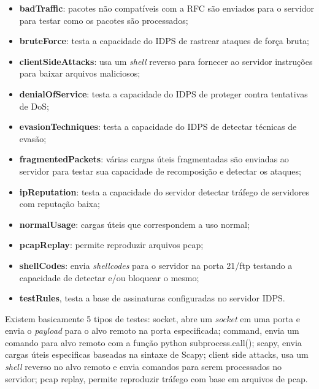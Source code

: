 \documentclass[
	12pt,				
	openright,		
	twoside,	
	a4paper,
	english,	
	brazil	
	]{abntex2}
\begin{document}
\begin{itemize}
 \item \textbf{badTraffic}: pacotes não compatíveis com a RFC são enviados para o servidor para testar como os pacotes são processados; 
 \item \textbf{bruteForce}: testa a capacidade do IDPS de rastrear ataques de força bruta;
 \item \textbf{clientSideAttacks}: usa um \textit{shell} reverso para fornecer ao servidor instruções para baixar arquivos maliciosos; 
 \item \textbf{denialOfService}: testa a capacidade do IDPS de proteger contra tentativas de DoS; 
 \item \textbf{evasionTechniques}: testa a capacidade do IDPS de detectar técnicas de evasão; 
 \item \textbf{fragmentedPackets}: várias cargas úteis fragmentadas são enviadas ao servidor para testar sua capacidade de recomposição e detectar os ataques; 
 \item \textbf{ipReputation}: testa a capacidade do servidor detectar tráfego de servidores com reputação baixa;
 \item \textbf{normalUsage}: cargas úteis que correspondem a uso normal; 
 \item \textbf{pcapReplay}: permite reproduzir arquivos pcap; 
 \item \textbf{shellCodes}: envia \textit{shellcodes} para o servidor na porta 21/ftp testando a capacidade de detectar e/ou bloquear o mesmo; 
 \item \textbf{testRules}, testa a base de assinaturas configuradas no servidor IDPS.
\end{itemize}

Existem basicamente 5 tipos de testes: socket, abre um \textit{socket} em uma porta e envia o \textit{payload} para o alvo remoto na porta especificada; command, envia um comando para alvo remoto com a função python subprocess.call(); scapy, envia cargas úteis especificas baseadas na sintaxe de Scapy; client side attacks, usa um \textit{shell} reverso no alvo remoto e envia comandos para serem processados no servidor; pcap replay, permite reproduzir tráfego com base em arquivos de pcap.
\end{document}

